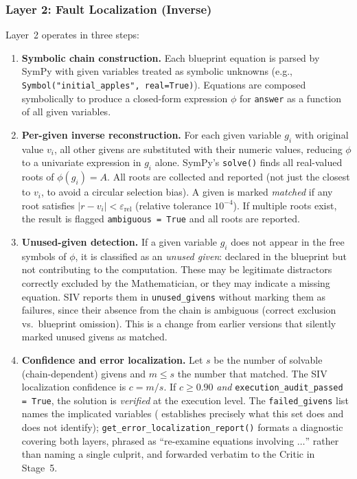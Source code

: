 \documentclass[11pt,a4paper]{article}
\begin{document}
\subsubsection{Layer 2: Fault Localization (Inverse)}

Layer~2 operates in three steps:

\begin{enumerate}[leftmargin=*,itemsep=2pt]
    \item \textbf{Symbolic chain construction.} Each blueprint equation is parsed by SymPy with given variables treated as symbolic unknowns (e.g., \texttt{Symbol("initial\_apples", real=True)}). Equations are composed symbolically to produce a closed-form expression $\phi$ for \texttt{answer} as a function of all given variables.

    \item \textbf{Per-given inverse reconstruction.} For each given variable $g_i$ with original value $v_i$, all other givens are substituted with their numeric values, reducing $\phi$ to a univariate expression in $g_i$ alone. SymPy's \texttt{solve()} finds all real-valued roots of $\phi(g_i) = A$. All roots are collected and reported (not just the closest to $v_i$, to avoid a circular selection bias). A given is marked \emph{matched} if any root satisfies $|r - v_i| < \varepsilon_{\text{rel}}$ (relative tolerance $10^{-4}$). If multiple roots exist, the result is flagged \texttt{ambiguous = True} and all roots are reported.

    \item \textbf{Unused-given detection.} If a given variable $g_i$ does not appear in the free symbols of $\phi$, it is classified as an \emph{unused given}: declared in the blueprint but not contributing to the computation. These may be legitimate distractors correctly excluded by the Mathematician, or they may indicate a missing equation. SIV reports them in \texttt{unused\_givens} without marking them as failures, since their absence from the chain is ambiguous (correct exclusion vs.\ blueprint omission). This is a change from earlier versions that silently marked unused givens as matched.

    \item \textbf{Confidence and error localization.} Let $s$ be the number of solvable (chain-dependent) givens and $m \leq s$ the number that matched. The SIV localization confidence is $c = m / s$. If $c \geq 0.90$ \emph{and} \texttt{execution\_audit\_passed = True}, the solution is \emph{verified} at the execution level. The \texttt{failed\_givens} list names the implicated variables ( establishes precisely what this set does and does not identify); \texttt{get\_error\_localization\_report()} formats a diagnostic covering both layers, phrased as ``re-examine equations involving $\ldots$'' rather than naming a single culprit, and forwarded verbatim to the Critic in Stage~5.
\end{enumerate}
\end{document}
